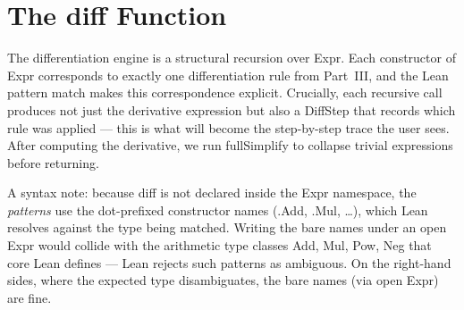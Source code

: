 \documentclass[12pt, openany]{book}
\theoremstyle{plain}
\theoremstyle{definition}
\theoremstyle{remark}
\newcommand{\li}[1]{{\ttfamily\small\color{tealaccent}#1}}
\begin{document}
\section{The \li{diff} Function}

The differentiation engine is a structural recursion over \li{Expr}.  Each constructor of \li{Expr} corresponds to exactly one differentiation rule from Part~III, and the Lean pattern match makes this correspondence explicit.  Crucially, each recursive call produces not just the derivative expression but also a \li{DiffStep} that records which rule was applied --- this is what will become the step-by-step trace the user sees.  After computing the derivative, we run \li{fullSimplify} to collapse trivial expressions before returning.

A syntax note: because \li{diff} is not declared inside the \li{Expr} namespace, the \emph{patterns} use the dot-prefixed constructor names (\li{.Add}, \li{.Mul}, \ldots), which Lean resolves against the type being matched.  Writing the bare names under an \li{open Expr} would collide with the arithmetic type classes \li{Add}, \li{Mul}, \li{Pow}, \li{Neg} that core Lean defines --- Lean rejects such patterns as ambiguous.  On the right-hand sides, where the expected type disambiguates, the bare names (via \li{open Expr}) are fine.
\end{document}
